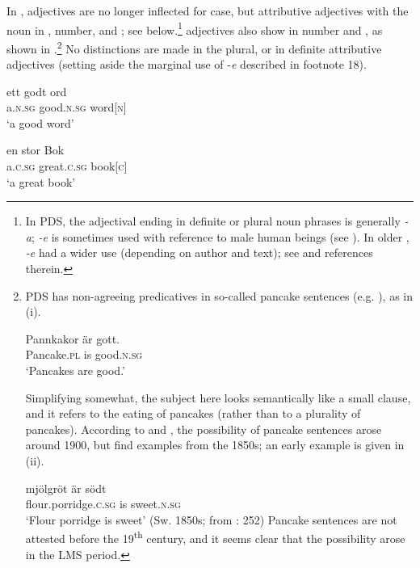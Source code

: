 \documentclass[output=paper]{langscibook}
\begin{document}
In , adjectives are no longer inflected for case, but attributive adjectives  with the noun in , number, and ; see  below.\footnote{In PDS, the adjectival ending in definite or plural noun phrases is generally \textit{{}-a}; \textit{{}-e} is sometimes used with reference to male human beings (see \citealt{Bylin2016}). In older , \textit{{}-e} had a wider use (depending on author and text); see \citet{Larsson2004} and references therein.}   adjectives also show  in number and , as shown in .\footnote{PDS has non-agreeing predicatives in so-called pancake sentences (e.g. \citealt{Josefsson2009}), as in (i).

\ea
\gll  Pannkakor   är   gott. \\
Pancake\textsc{.pl}  is   good\textsc{.n.sg}\\
\glt ‘Pancakes are good.’
\z

Simplifying somewhat, the subject here looks semantically like a small clause, and it refers to the eating of pancakes (rather than to a plurality of pancakes). According to \citet{Faarlund1977} and \citet{Josefsson2014}, the possibility of pancake sentences arose around 1900, but \citet{HaugenEtAl2019} find  examples from the 1850s; an early example is given in (ii).

\ea \gll mjölgröt     är södt\\
        flour.porridge\textsc{.c.sg}   is sweet\textsc{.n.sg}\\
        \glt ‘Flour porridge is sweet’ (Sw. 1850s; from \citealt{HaugenEtAl2019}: 252)
\z Pancake sentences are not attested before the 19\textsuperscript{th} century, and it seems clear that the possibility arose in the LMS period.} No  distinctions are made in the plural, or in definite attributive adjectives (setting aside the marginal use of -\textit{e} described in footnote 18).


\ea\label{ex:intro:35}
\ea\label{ex:intro:35b}
\gll  ett       godt         ord\\
a.\textsc{n.sg}  good.\textsc{n.sg}  word[\textsc{n]}\\
\glt ‘a good word’

\ex\label{ex:intro:35a}
\gll  en       stor           Bok \\
a.\textsc{c.sg}  great.\textsc{c.sg}  book[\textsc{c]}\\
\glt ‘a great book’
\end{document}
